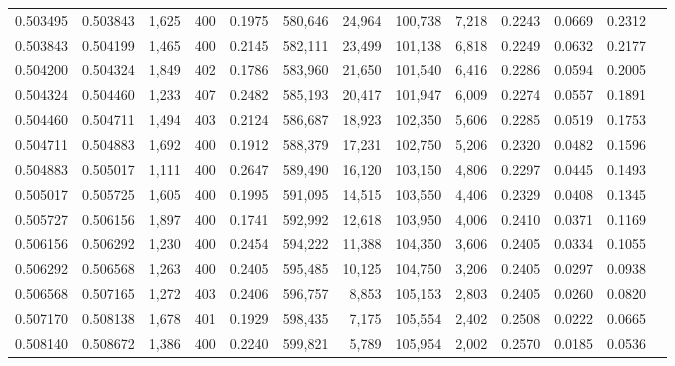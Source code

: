 \begin{tabular}{rrrrrrrrrrrrr}
0.503495 & 0.503843 & 1,625 & 400 &                                     0.1975 & 580,646 &  24,964 & 100,738 &   7,218 & 0.2243 & 0.0669 & 0.2312 \\
0.503843 & 0.504199 & 1,465 & 400 &                                     0.2145 & 582,111 &  23,499 & 101,138 &   6,818 & 0.2249 & 0.0632 & 0.2177 \\
0.504200 & 0.504324 & 1,849 & 402 &                                     0.1786 & 583,960 &  21,650 & 101,540 &   6,416 & 0.2286 & 0.0594 & 0.2005 \\
0.504324 & 0.504460 & 1,233 & 407 &                                     0.2482 & 585,193 &  20,417 & 101,947 &   6,009 & 0.2274 & 0.0557 & 0.1891 \\
0.504460 & 0.504711 & 1,494 & 403 &                                     0.2124 & 586,687 &  18,923 & 102,350 &   5,606 & 0.2285 & 0.0519 & 0.1753 \\
0.504711 & 0.504883 & 1,692 & 400 &                                     0.1912 & 588,379 &  17,231 & 102,750 &   5,206 & 0.2320 & 0.0482 & 0.1596 \\
0.504883 & 0.505017 & 1,111 & 400 &                                     0.2647 & 589,490 &  16,120 & 103,150 &   4,806 & 0.2297 & 0.0445 & 0.1493 \\
0.505017 & 0.505725 & 1,605 & 400 &                                     0.1995 & 591,095 &  14,515 & 103,550 &   4,406 & 0.2329 & 0.0408 & 0.1345 \\
0.505727 & 0.506156 & 1,897 & 400 &                                     0.1741 & 592,992 &  12,618 & 103,950 &   4,006 & 0.2410 & 0.0371 & 0.1169 \\
0.506156 & 0.506292 & 1,230 & 400 &                                     0.2454 & 594,222 &  11,388 & 104,350 &   3,606 & 0.2405 & 0.0334 & 0.1055 \\
0.506292 & 0.506568 & 1,263 & 400 &                                     0.2405 & 595,485 &  10,125 & 104,750 &   3,206 & 0.2405 & 0.0297 & 0.0938 \\
0.506568 & 0.507165 & 1,272 & 403 &                                     0.2406 & 596,757 &   8,853 & 105,153 &   2,803 & 0.2405 & 0.0260 & 0.0820 \\
0.507170 & 0.508138 & 1,678 & 401 &                                     0.1929 & 598,435 &   7,175 & 105,554 &   2,402 & 0.2508 & 0.0222 & 0.0665 \\
0.508140 & 0.508672 & 1,386 & 400 &                                     0.2240 & 599,821 &   5,789 & 105,954 &   2,002 & 0.2570 & 0.0185 & 0.0536 \\

\end{tabular}
